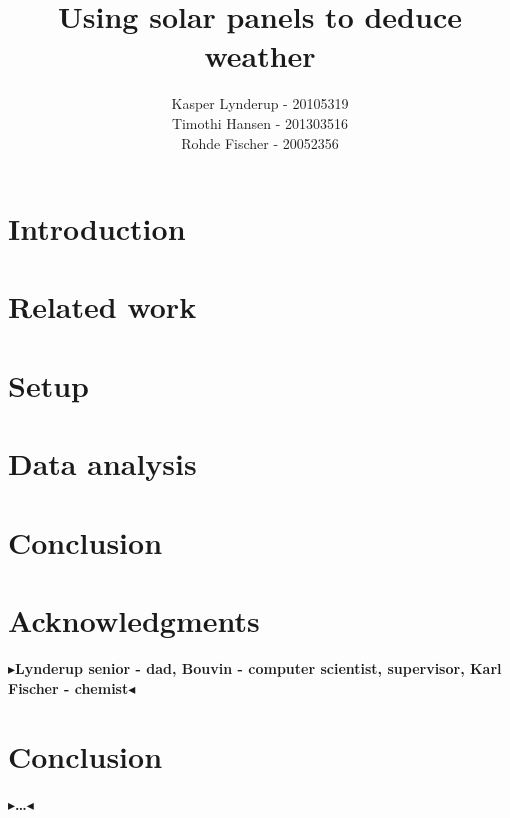 \documentclass[a4paper]{article}
\makeatletter
\newcommand\csAdvisor[1]{\renewcommand\@csAdvisor{#1}}
\newcommand\@csAdvisor{\@latex@error{No \noexpand\csAdvisor given}\@ehc}
\newcommand{\todo}[1]{{\color[rgb]{.5,0,0}\textbf{$\blacktriangleright$#1$\blacktriangleleft$}}}
\makeatother
\begin{document}
\author{Kasper Lynderup - 20105319\\Timothi Hansen - 201303516\\Rohde Fischer - 20052356}
\csAdvisor{Niels Olof Bouvin}
\title{Using solar panels to deduce weather}
\pagestyle{empty}
\maketitle


\pagestyle{plain}
\setcounter{page}{1}

\tableofcontents
{}
\setcounter{secnumdepth}{2}


\section{Introduction}


\section{Related work}


\section{Setup}


\section{Data analysis}


\section{Conclusion}



\section{Acknowledgments}
\todo{Lynderup senior - dad,
  Bouvin - computer scientist, supervisor,
  Karl Fischer - chemist}

\section{Conclusion}
\label{ch:conclusion}

\todo{\dots}




\end{document}
